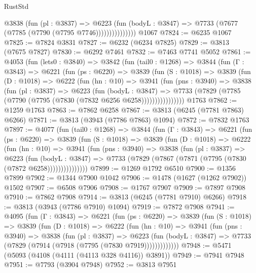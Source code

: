 \begin{lexlean}{RustStd}
\begin{coremodule}
{\begin{coremodule}
{{{{{{{{{{{{{{{{{{{{{{{{{{{{{{{{{{{                    @3838
                      (fun (pl : @3837) =>
                      @6223
                        (fun (bodyL : @3847) =>
                        @7733 (@7677 (@7785 (@7790 (@7795 @7746)))))))))))))))
    @1067
@7824 := @6235 @1067
@7825 := @7824 @3831
@7827 := @6232 (@6234 @7825)
@7829 := @3813 (@7675 @7827)
@7830 := @6292 @7461
@7832 := @7463 @7741 @5052
@7861 := @4053
    (fun (lets0 : @3840) =>
    @3842
      (fun (tail0 : @1268) =>
      @3844
        (fun (Γ : @3843) =>
        @6221
          (fun (ps : @6220) =>
          @3839
            (fun (S : @1018) =>
            @3839
              (fun (D : @1018) =>
              @6222
                (fun (hn : @10) =>
                @3941
                  (fun (pns : @3940) =>
                  @3838
                    (fun (pl : @3837) =>
                    @6223
                      (fun (bodyL : @3847) =>
                      @7733 (@7829 (@7785 (@7790 (@7795 (@7830 (@7832 @6256 @6258))))))))))))))))
    @1763
@7862 := @1259 @1763
@7863 := @7862 @6258
@7867 := @3813 (@6245 (@7781 @7863) @6266)
@7871 := @3813 (@3943 (@7786 @7863) @1094)
@7872 := @7832 @1763
@7897 := @4077
    (fun (tail0 : @1268) =>
    @3844
      (fun (Γ : @3843) =>
      @6221
        (fun (ps : @6220) =>
        @3839
          (fun (S : @1018) =>
          @3839
            (fun (D : @1018) =>
            @6222
              (fun (hn : @10) =>
              @3941
                (fun (pns : @3940) =>
                @3838
                  (fun (pl : @3837) =>
                  @6223
                    (fun (bodyL : @3847) =>
                    @7733 (@7829 (@7867 (@7871 (@7795 (@7830 (@7872 @6258)))))))))))))))
@7899 := @1269 @1792 @6510
@7900 := @1356 @7899
@7902 := @1344 @7900 @1042
@7906 := @1478 (@1627 (@1262 @7902)) @1502
@7907 := @6508 @7906
@7908 := @1767 @7907
@7909 := @7897 @7908
@7910 := @7862 @7908
@7914 := @3813 (@6245 (@7781 @7910) @6266)
@7918 := @3813 (@3943 (@7786 @7910) @1094)
@7919 := @7872 @7908
@7941 := @4095
    (fun (Γ : @3843) =>
    @6221
      (fun (ps : @6220) =>
      @3839
        (fun (S : @1018) =>
        @3839
          (fun (D : @1018) =>
          @6222
            (fun (hn : @10) =>
            @3941
              (fun (pns : @3940) =>
              @3838
                (fun (pl : @3837) =>
                @6223
                  (fun (bodyL : @3847) =>
                  @7733 (@7829 (@7914 (@7918 (@7795 (@7830 @7919)))))))))))))
@7948 := @5471 (@5093 (@4108 (@4111 (@4113 @328 @4116)) @3891))
@7949 := @7941 @7948
@7951 := @7793 (@3904 @7948)
@7952 := @3813 @7951
}}}}}}}}}}}}}}}}}}}}}}}}}}}}}}}}}}}
\end{coremodule}}
\end{coremodule}
\end{lexlean}
